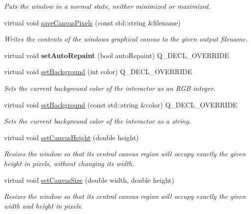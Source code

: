 \begin{DoxyCompactItemize}
\begin{DoxyCompactList}\small\item\em Puts the window in a normal state, neither minimized or maximized. \end{DoxyCompactList}\item 
virtual void \mbox{\hyperlink{classGWindow_aba99f6a53d9bb0493e7fc3ead6a2e4a3}{save\+Canvas\+Pixels}} (const std\+::string \&filename)
\begin{DoxyCompactList}\small\item\em Writes the contents of the window\textquotesingle{}s graphical canvas to the given output filename. \end{DoxyCompactList}\item 
virtual void {\bfseries set\+Auto\+Repaint} (bool auto\+Repaint) Q\+\_\+\+D\+E\+C\+L\+\_\+\+O\+V\+E\+R\+R\+I\+DE
\item 
virtual void \mbox{\hyperlink{classGWindow_a427fefbbc34e39e5df27a807da488e0d}{set\+Background}} (int color) Q\+\_\+\+D\+E\+C\+L\+\_\+\+O\+V\+E\+R\+R\+I\+DE
\begin{DoxyCompactList}\small\item\em Sets the current background color of the interactor as an R\+GB integer. \end{DoxyCompactList}\item 
virtual void \mbox{\hyperlink{classGWindow_a222fcfb542aa6094c7e0de671bd69627}{set\+Background}} (const std\+::string \&color) Q\+\_\+\+D\+E\+C\+L\+\_\+\+O\+V\+E\+R\+R\+I\+DE
\begin{DoxyCompactList}\small\item\em Sets the current background color of the interactor as a string. \end{DoxyCompactList}\item 
virtual void \mbox{\hyperlink{classGWindow_a059f69fab57ad2cca2243c5a64f7306d}{set\+Canvas\+Height}} (double height)
\begin{DoxyCompactList}\small\item\em Resizes the window so that its central canvas region will occupy exactly the given height in pixels, without changing its width. \end{DoxyCompactList}\item 
virtual void \mbox{\hyperlink{classGWindow_a06022723e253be88ca7e48034ff66244}{set\+Canvas\+Size}} (double width, double height)
\begin{DoxyCompactList}\small\item\em Resizes the window so that its central canvas region will occupy exactly the given width and height in pixels. \end{DoxyCompactList}\item 

\end{DoxyCompactItemize}
